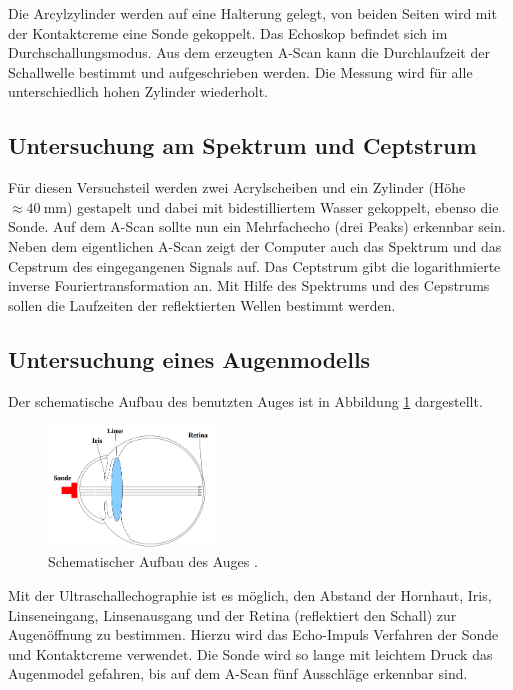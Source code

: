 Die Arcylzylinder werden auf eine Halterung gelegt, von beiden Seiten wird
mit der Kontaktcreme eine Sonde gekoppelt. Das Echoskop befindet sich im
Durchschallungsmodus. Aus dem erzeugten A-Scan kann die Durchlaufzeit der
Schallwelle bestimmt und aufgeschrieben werden. Die Messung wird für alle unterschiedlich
hohen Zylinder wiederholt.

\subsection{Untersuchung am Spektrum und Ceptstrum}

Für diesen Versuchsteil werden zwei Acrylscheiben und ein Zylinder (Höhe $\approx \SI{40}{\milli\meter}$)
gestapelt und dabei mit bidestilliertem Wasser gekoppelt, ebenso die Sonde.
Auf dem A-Scan sollte nun ein Mehrfachecho (drei Peaks) erkennbar sein.
Neben dem eigentlichen A-Scan zeigt der Computer auch das Spektrum und das Cepstrum des
eingegangenen Signals auf. %
Das Ceptstrum gibt die logarithmierte inverse Fouriertransformation an.
Mit Hilfe des Spektrums und des Cepstrums sollen die Laufzeiten der reflektierten Wellen
bestimmt werden.

\subsection{Untersuchung eines Augenmodells}

Der schematische Aufbau des benutzten Auges ist in Abbildung \ref{fig: auge} dargestellt.
\begin{figure}[h]
  \centering
  \includegraphics[width=0.4\textwidth]{pics/auge.png}
  \caption{Schematischer Aufbau des Auges \cite{anleitungus1}.}
  \label{fig: auge}
\end{figure}
Mit der Ultraschallechographie ist es möglich, den Abstand der Hornhaut, Iris, Linseneingang, Linsenausgang
und der Retina (reflektiert den Schall) zur Augenöffnung zu bestimmen.
Hierzu wird das Echo-Impuls Verfahren der Sonde und Kontaktcreme verwendet.
Die Sonde wird so lange mit leichtem Druck das Augenmodel gefahren, bis auf dem
A-Scan fünf Ausschläge erkennbar sind.
